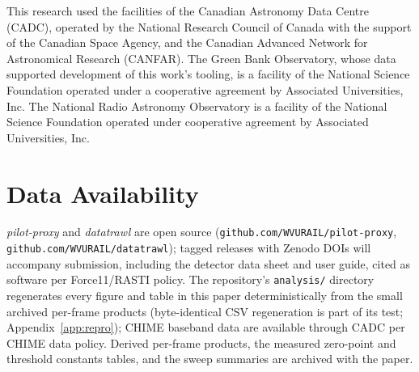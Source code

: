 This research used the facilities of the Canadian Astronomy Data Centre
(CADC), operated by the National Research Council of Canada with the
support of the Canadian Space Agency, and the Canadian Advanced Network
for Astronomical Research (CANFAR). The Green Bank Observatory, whose
data supported development of this work's tooling, is a facility of the
National Science Foundation operated under a cooperative agreement by
Associated Universities, Inc. The National Radio Astronomy Observatory
is a facility of the National Science Foundation operated under
cooperative agreement by Associated Universities, Inc.

\section*{Data Availability}
\label{sec:availability}

\textit{pilot-proxy} and \textit{datatrawl} are open source
(\texttt{github.com/\allowbreak WVURAIL/\allowbreak pilot-proxy},
\texttt{github.com/\allowbreak WVURAIL/\allowbreak datatrawl}); tagged
releases with Zenodo DOIs
will accompany submission, including the detector data sheet and user
guide, cited as software per Force11/RASTI policy. The repository's
\texttt{analysis/} directory regenerates every figure and table in this
paper deterministically from the small archived per-frame products
(byte-identical CSV regeneration is part of its test;
Appendix~\ref{app:repro}); CHIME baseband data are available through CADC
per CHIME data policy. Derived per-frame products, the measured zero-point
and threshold constants tables, and the sweep summaries are archived with
the paper.
